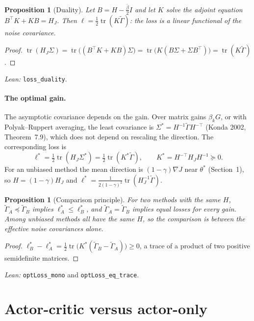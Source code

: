 \documentclass[11pt]{article}
\newtheorem{proposition}[theorem]{Proposition}
\theoremstyle{definition}
\theoremstyle{remark}
\DeclareMathOperator{\tr}{tr}
\begin{document}
\begin{proposition}[Duality]\label{prop:dual}
Let $B = H - \frac{\bar\beta}{2}I$ and let $K$ solve the adjoint equation $B^\top K + KB = H_J$. Then
$\ell = \frac12\tr(K\tilde\Gamma)$: the loss is a linear functional of the noise covariance.
\end{proposition}
\begin{proof}
$\tr(H_J\Sigma) = \tr\big((B^\top K + KB)\Sigma\big) = \tr\big(K(B\Sigma + \Sigma B^\top)\big) = \tr(K\tilde\Gamma)$.
\end{proof}
\noindent\emph{Lean:} \texttt{loss\_duality}.

\paragraph{The optimal gain.} The asymptotic covariance depends on the gain. Over matrix gains
$\beta_kG$, or with Polyak--Ruppert averaging, the least covariance is $\Sigma^* = H^{-1}\tilde\Gamma H^{-\top}$
(Konda 2002, Theorem~7.9), which does not depend on rescaling the direction. The corresponding
loss is
\[
  \ell^* = \tfrac12\tr(H_J\Sigma^*) = \tfrac12\tr(K^*\tilde\Gamma),\qquad K^* = H^{-\top}H_JH^{-1} \succeq 0 .
\]
For an unbiased method the mean direction is $(1-\gamma)\nabla J$ near $\theta^*$ (Section~1), so
$H = (1-\gamma)H_J$ and $\ell^* = \frac{1}{2(1-\gamma)^2}\tr(H_J^{-1}\tilde\Gamma)$.

\begin{proposition}[Comparison principle]\label{prop:compare}
For two methods with the same $H$, $\tilde\Gamma_A \preceq \tilde\Gamma_B$ implies $\ell^*_A \le \ell^*_B$, and
$\tilde\Gamma_A = \tilde\Gamma_B$ implies equal losses for every gain. Among unbiased methods all have
the same $H$, so the comparison is between the effective noise covariances alone.
\end{proposition}
\begin{proof}
$\ell^*_B - \ell^*_A = \frac12\tr\big(K^*(\tilde\Gamma_B - \tilde\Gamma_A)\big) \ge 0$, a trace of a product of
two positive semidefinite matrices.
\end{proof}
\noindent\emph{Lean:} \texttt{optLoss\_mono} and \texttt{optLoss\_eq\_trace}.

\section{Actor-critic versus actor-only}
\end{document}
